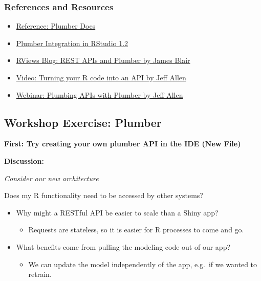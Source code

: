 \documentclass[]{book}
\providecommand{\tightlist}{%
  \setlength{\itemsep}{0pt}\setlength{\parskip}{0pt}}
\theoremstyle{definition}
\theoremstyle{definition}
\theoremstyle{definition}
\theoremstyle{remark}
\begin{document}
\hypertarget{references-and-resources-2}{%
\subsubsection{References and
Resources}\label{references-and-resources-2}}

\begin{itemize}
\tightlist
\item
  \href{https://www.rplumber.io/}{Reference: Plumber Docs}
\item
  \href{https://blog.rstudio.com/2018/10/23/rstudio-1-2-preview-plumber-integration/}{Plumber
  Integration in RStudio 1.2}
\item
  \href{https://rviews.rstudio.com/2018/07/23/rest-apis-and-plumber/}{RViews
  Blog: REST APIs and Plumber by James Blair}
\item
  \href{https://www.rstudio.com/resources/videos/plumber-turning-your-r-code-into-an-api/}{Video:
  Turning your R code into an API by Jeff Allen}
\item
  \href{https://www.rstudio.com/resources/videos/plumbing-apis-with-plumber/}{Webinar:
  Plumbing APIs with Plumber by Jeff Allen}
\end{itemize}

\hypertarget{workshop-exercise-plumber}{%
\subsection{Workshop Exercise:
Plumber}\label{workshop-exercise-plumber}}

\textbf{First: Try creating your own plumber API in the IDE (New File)}

\textbf{Discussion:}

\emph{Consider our new architecture}

Does my R functionality need to be accessed by other systems?

\begin{itemize}
\tightlist
\item
  Why might a RESTful API be easier to scale than a Shiny app?

  \begin{itemize}
  \tightlist
  \item
    Requests are stateless, so it is easier for R processes to come and
    go.
  \end{itemize}
\item
  What benefits come from pulling the modeling code out of our app?

  \begin{itemize}
  \tightlist
  \item
    We can update the model independently of the app, e.g.~if we wanted
    to retrain.
  \end{itemize}
\end{itemize}
\end{document}
